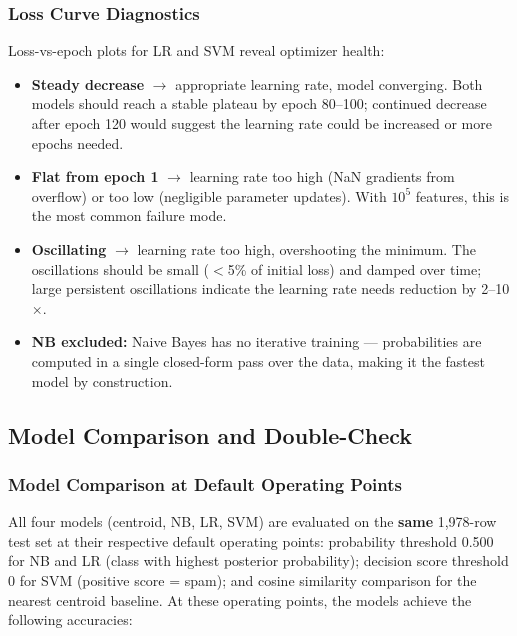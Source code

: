 \subsubsection{Loss Curve Diagnostics}

Loss-vs-epoch plots for LR and SVM reveal optimizer health:

\begin{itemize}
  \item \textbf{Steady decrease} $\rightarrow$ appropriate learning rate, model converging. Both models should reach a stable plateau by epoch 80--100; continued decrease after epoch 120 would suggest the learning rate could be increased or more epochs needed.
  \item \textbf{Flat from epoch 1} $\rightarrow$ learning rate too high (NaN gradients from overflow) or too low (negligible parameter updates). With $10^5$ features, this is the most common failure mode.
  \item \textbf{Oscillating} $\rightarrow$ learning rate too high, overshooting the minimum. The oscillations should be small ($<$5\% of initial loss) and damped over time; large persistent oscillations indicate the learning rate needs reduction by 2--10$\times$.
  \item \textbf{NB excluded:} Naive Bayes has no iterative training — probabilities are computed in a single closed-form pass over the data, making it the fastest model by construction.
\end{itemize}

\subsection{Model Comparison and Double-Check}

\subsubsection{Model Comparison at Default Operating Points}

All four models (centroid, NB, LR, SVM) are evaluated on the \textbf{same} 1,978-row test set at their respective default operating points: probability threshold 0.500 for NB and LR (class with highest posterior probability); decision score threshold 0 for SVM (positive score = spam); and cosine similarity comparison for the nearest centroid baseline. At these operating points, the models achieve the following accuracies:

